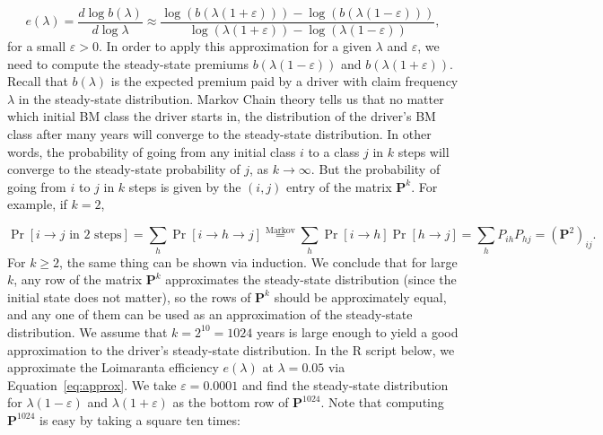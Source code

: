 \documentclass{article}
\begin{document}
\begin{equation}
e(\lambda) = \frac{d \log b(\lambda)}{d \log \lambda} \approx \frac{\log(b(\lambda(1 + \varepsilon))) - \log(b(\lambda(1 - \varepsilon)))}{\log(\lambda(1 + \varepsilon)) - \log(\lambda(1 - \varepsilon))}, \label{eq:approx}
\end{equation}
for a small $\varepsilon > 0$. In order to apply this approximation for a given $\lambda$ and $\varepsilon$, we need to compute the steady-state premiums $b(\lambda(1 - \varepsilon))$ and $b(\lambda(1 + \varepsilon))$. \newline
Recall that $b(\lambda)$ is the expected premium paid by a driver with claim frequency $\lambda$ in the steady-state distribution. Markov Chain theory tells us that no matter which initial BM class the driver starts in, the distribution of the driver's BM class after many years will converge to the steady-state distribution. In other words, the probability of going from any initial class $i$ to a class $j$ in $k$ steps will converge to the steady-state probability of $j$, as $k \to \infty$. \newline
But the probability of going from $i$ to $j$ in $k$ steps is given by the $(i, j)$ entry of the matrix $\mathbf{P}^k$. For example, if $k = 2$,
 
\begin{equation*}
\Pr[i \to j \text{ in 2 steps}] = \sum_h \Pr[i \to h \to j] \stackrel{\text{Markov}}{=} \sum_h \Pr[i \to h] \Pr[h \to j] = \sum_h P_{ih} P_{hj} = (\mathbf{P}^2)_{ij}.
\end{equation*}
For $k \geq 2$, the same thing can be shown via induction. \newline
We conclude that for large $k$, any row of the matrix $\mathbf{P}^k$ approximates the steady-state distribution (since the initial state does not matter), so the rows of $\mathbf{P}^k$ should be approximately equal, and any one of them can be used as an approximation of the steady-state distribution. We assume that $k = 2^{10} = 1024$ years is large enough to yield a good approximation to the driver's steady-state distribution. \newline \newline
In the R script below, we approximate the Loimaranta efficiency $e(\lambda)$ at $\lambda = 0.05$ via Equation~\ref{eq:approx}. We take $\varepsilon = 0.0001$ and find the steady-state distribution for $\lambda(1 - \varepsilon)$ and $\lambda(1 + \varepsilon)$ as the bottom row of $\mathbf{P}^{1024}$. Note that computing $\mathbf{P}^{1024}$ is easy by taking a square ten times:
 
\end{document}
